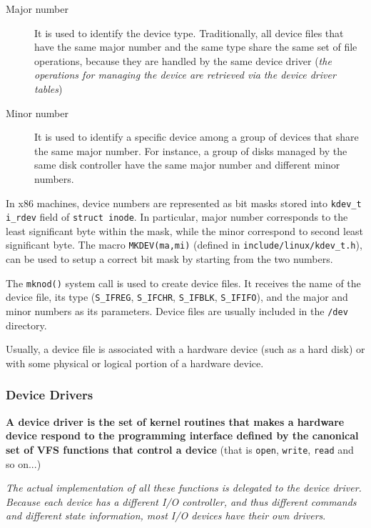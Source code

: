 \documentclass[10pt,a4paper]{article}
\begin{document}
\begin{description}

\item[Major number] It is used to identify the device type. Traditionally, all device files that have the same major number and the same type share the same set of file operations, because they are handled by the same device driver (\textit{the operations for managing the device are retrieved via the device driver tables})
\item[Minor number] It is used to identify a specific device among a group of devices that share the same major number. For instance, a group of disks managed by the same disk controller have the same major number and different minor numbers.
\end{description}

In x86 machines, device numbers are represented as bit masks stored into \texttt{kdev\_t i\_rdev} field of \texttt{struct inode}. In particular, major number corresponds to the least significant byte within the mask, while the minor correspond to second least significant byte. The macro \texttt{MKDEV(ma,mi)} (defined in \texttt{include/linux/kdev\_t.h}), can be used to setup a correct bit mask by starting from the two numbers.

The \texttt{mknod()} system call is used to create device files. It receives the name of the device file, its type (\texttt{S\_IFREG}, \texttt{S\_IFCHR}, \texttt{S\_IFBLK}, \texttt{S\_IFIFO}), and the major and minor numbers as its parameters. Device files are usually included in the \texttt{/dev} directory.

Usually, a device file is associated with a hardware device (such as a hard disk) or with some physical or logical portion of a hardware device.

\subsubsection{Device Drivers}

\textbf{A device driver is the set of kernel routines that makes a hardware device respond to the programming interface defined by the canonical set of VFS functions that control a device} (that is \texttt{open}, \texttt{write}, \texttt{read} and so on...) 

\textit{The actual implementation of all these functions is delegated to the device driver. Because each device has a different I/O controller, and thus different commands and different state information, most I/O devices have their own drivers}.
\end{document}
